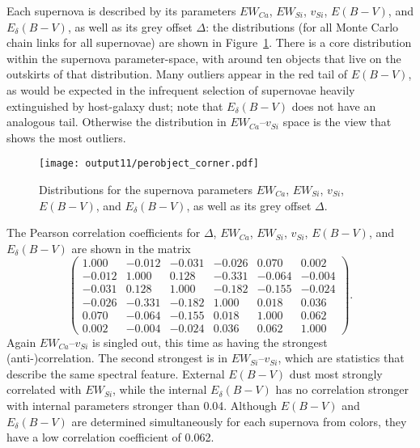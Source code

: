 \documentclass[11pt, oneside]{article}   	%
\begin{document}
Each supernova is described by its parameters $EW_{Ca}$, $EW_{Si}$, $v_{Si}$, $E(B-V)$, and $E_\delta(B-V)$, as well as its grey offset
$\Delta$: the distributions (for all Monte Carlo chain links for all supernovae) are shown in Figure~\ref{perobject:fig}.
There is a core distribution within the supernova parameter-space, with around ten objects that live on the outskirts of that
distribution.  Many outliers appear in the red tail of $E(B-V)$, as would be expected in the infrequent selection of supernovae
heavily extinguished by host-galaxy dust; note that $E_\delta(B-V)$ does not have an analogous tail.
Otherwise the distribution in $EW_{Ca}$--$v_{Si}$ space is the view that
shows the most outliers. 

\begin{figure}[htbp] %
   \centering
   \texttt{[image: output11/perobject\_corner.pdf]} 
   \caption{Distributions for the supernova parameters $EW_{Ca}$, $EW_{Si}$, $v_{Si}$, $E(B-V)$, and $E_\delta(B-V)$, as well as its grey offset
$\Delta$.
   \label{perobject:fig}}
\end{figure}

The Pearson correlation coefficients for $\Delta$, $EW_{Ca}$, $EW_{Si}$, $v_{Si}$, $E(B-V)$, and $E_\delta(B-V)$ are shown in the matrix
\begin{equation}
\begin{pmatrix}
1.000 & -0.012 & -0.031 & -0.026 & 0.070 & 0.002 \\
-0.012 & 1.000 & 0.128 & -0.331 & -0.064 & -0.004 \\
-0.031 & 0.128 & 1.000 & -0.182 & -0.155 & -0.024 \\
-0.026 & -0.331 & -0.182 & 1.000 & 0.018 & 0.036 \\
0.070 & -0.064 & -0.155 & 0.018 & 1.000 & 0.062 \\
0.002 & -0.004 & -0.024 & 0.036 & 0.062 & 1.000
\end{pmatrix}.
\end{equation}
Again  $EW_{Ca}$--$v_{Si}$ is singled out, this time as having the strongest (anti-)correlation.  The second strongest is in
$EW_{Si}$--$v_{Si}$, which are statistics that describe the same spectral feature.
External $E(B-V)$ dust most strongly correlated with $EW_{Si}$, while the internal $E_\delta(B-V)$  has no correlation stronger with internal parameters stronger than
0.04.  Although $E(B-V)$ and $E_\delta(B-V)$ are determined simultaneously for each supernova from colors, they have a low correlation coefficient of 0.062.
\end{document}
